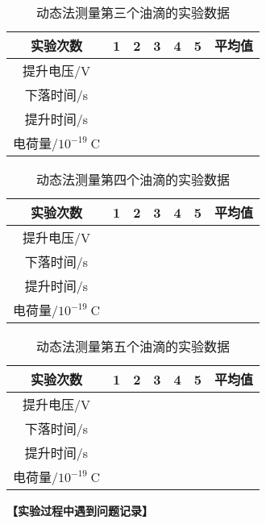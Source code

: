 \documentclass[11pt,a4paper]{ctexart}
\begin{document}
\begin{table}[h!]
\centering
\caption{动态法测量第三个油滴的实验数据}
\label{my-label}
\begin{tabular}{|c|p{12mm}|p{12mm}|p{12mm}|p{12mm}|p{12mm}|p{12mm}|}
\hline
实验次数 & 1 & 2 & 3 & 4 & 5 & 平均值 \\ \hline
提升电压/V &  &  &  &  &  &  \\ \hline
下落时间/s &  &  &  &  &  &  \\ \hline
提升时间/s &  &  &  &  &  &  \\ \hline
电荷量/$10^{-19}\mathrm{\ C}$ &  &  &  &  &  &  \\ \hline
\end{tabular}
\end{table}
\newpage
\begin{table}[h!]
\centering
\caption{动态法测量第四个油滴的实验数据}
\label{my-label}
\begin{tabular}{|c|p{12mm}|p{12mm}|p{12mm}|p{12mm}|p{12mm}|p{12mm}|}
\hline
实验次数 & 1 & 2 & 3 & 4 & 5 & 平均值 \\ \hline
提升电压/V &  &  &  &  &  &  \\ \hline
下落时间/s &  &  &  &  &  &  \\ \hline
提升时间/s &  &  &  &  &  &  \\ \hline
电荷量/$10^{-19}\mathrm{\ C}$ &  &  &  &  &  &  \\ \hline
\end{tabular}
\end{table}
\begin{table}[h!]
\centering
\caption{动态法测量第五个油滴的实验数据}
\label{my-label}
\begin{tabular}{|c|p{12mm}|p{12mm}|p{12mm}|p{12mm}|p{12mm}|p{12mm}|}
\hline
实验次数 & 1 & 2 & 3 & 4 & 5 & 平均值 \\ \hline
提升电压/V &  &  &  &  &  &  \\ \hline
下落时间/s &  &  &  &  &  &  \\ \hline
提升时间/s &  &  &  &  &  &  \\ \hline
电荷量/$10^{-19}\mathrm{\ C}$ &  &  &  &  &  &  \\ \hline
\end{tabular}
\end{table}
\textbf{【实验过程中遇到问题记录】}
\fi


\end{document}
